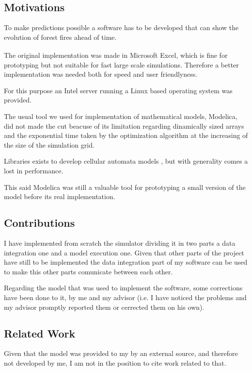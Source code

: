 \documentclass[Lau]{sapthesis} %
\begin{document}
\subsection{Motivations}

To make predictions possible a software has to be developed that can show the
evolution of forest fires ahead of time.

The original implementation was made in Microsoft
Excel\textsuperscript{\textregistered}, which is fine for prototyping but not
suitable for fast large scale simulations. Therefore a better implementation was
needed both for speed and user friendlyness.

For this purpose an Intel server running a Linux based operating system was
provided.

The usual tool we used for implementation of mathematical models, Modelica, did
not made the cut beacuse of its limitation regarding dinamically sized arrays
and the exponential time taken by the optimization algorithm at the increasing
of the size of the simulation grid.

Libraries exists to develop cellular automata models \cite{calib2}, but with
generality comes a lost in performance.

This said Modelica was still a valuable tool for prototyping a small version of
the model before its real implementation.

\subsection{Contributions}

I have implemented from scratch the simulator dividing it in two parts a data
integration one and a model execution one. Given that other parts of the project
have still to be implemented the data integration part of my software can be
used to make this other parts comunicate between each other.

Regarding the model that was used to implement the software, some corrections
have been done to it, by me and my advisor (i.e. I have noticed the problems and
my advisor promptly reported them or cerrected them on his own).

\subsection{Related Work}

Given that the model was provided to my by an external source, and therefore not
developed by me, I am not in the position to cite work related to that.
\end{document}
